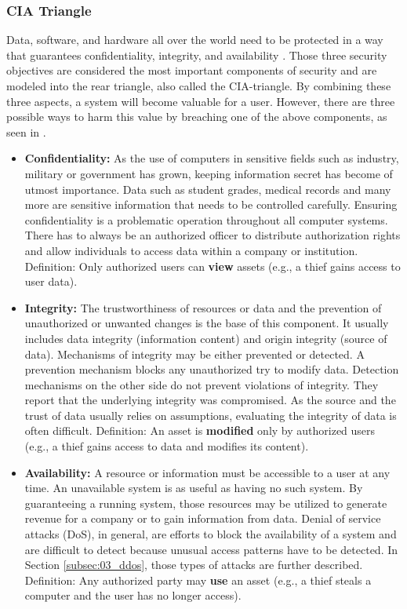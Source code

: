 \subsubsection{CIA Triangle}
Data, software, and hardware all over the world need to be protected in a way that guarantees confidentiality, integrity, and availability \cite{Pfleeger2014}. Those three security objectives are considered the most important components of security and are modeled into the rear triangle, also called the CIA-triangle. By combining these three aspects, a system will become valuable for a user. However, there are three possible ways to harm this value by breaching one of the above components, as seen in \cite{Bishop2004}.
\begin{itemize}
  \item \textbf{Confidentiality:} As the use of computers in sensitive fields such as industry, military or government has grown, keeping information secret has become of utmost importance. Data such as student grades, medical records and many more are sensitive information that needs to be controlled carefully. Ensuring confidentiality is a problematic operation throughout all computer systems. There has to always be an authorized officer to distribute  authorization rights and allow individuals to access data within a company or institution.
        \subitem Definition: Only authorized users can \textbf{view} assets (e.g., a thief gains access to user data).
  \item \textbf{Integrity:} The trustworthiness of resources or data and the prevention of unauthorized or unwanted changes is the base of this component. It usually includes data integrity (information content) and origin integrity (source of data). Mechanisms of integrity may be either prevented or detected. A prevention mechanism blocks any unauthorized try to modify data. Detection mechanisms on the other side do not prevent violations of integrity. They report that the underlying integrity was compromised. As the source and the trust of data usually relies on assumptions, evaluating the integrity of data is often difficult.
        \subitem Definition: An asset is \textbf{modified} only by authorized users (e.g., a thief gains access to data and modifies its content).
  \item \textbf{Availability:} A resource or information must be accessible to a user at any time. An unavailable system is as useful as having no such system. By guaranteeing a running system, those resources may be utilized to generate revenue for a company or to gain information from data. Denial of service attacks (DoS), in general, are efforts to block the availability of a system and are difficult to detect because unusual access patterns have to be detected. In Section \ref{subsec:03_ddos}, those types of attacks are further described.
        \subitem Definition: Any authorized party may \textbf{use} an asset (e.g., a thief steals a computer and the user has no longer access).
\end{itemize}

